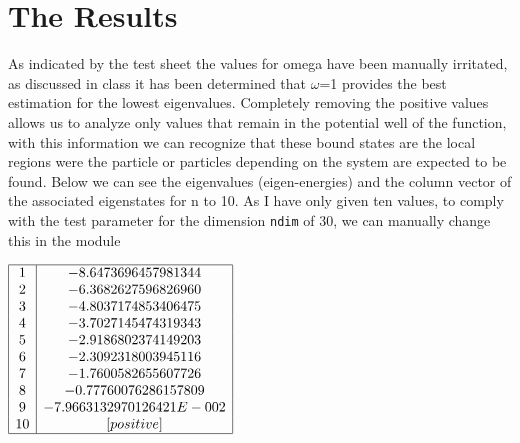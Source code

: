 \documentclass[12pt,letterpaper,notitlepage]{article}
\begin{document}
 \section{The Results}
 
 As indicated by the test sheet the values for omega have been manually irritated, as discussed in class it has been determined that $\omega$=1 provides the best estimation for the lowest eigenvalues. Completely removing the positive values allows us to analyze only values that remain in the potential well of the function, with this information we can recognize that these bound states are the local regions were the particle or particles depending on the system are expected to be found. Below we can see the eigenvalues (eigen-energies) and the column vector of the associated eigenstates for n to 10.  As I have only given ten values, to comply with the test parameter for the dimension {\tt ndim} of 30, we can manually change this in the module
 
\begin {center}
	$\begin{array} {|c|c|}
		\hline
	   1  &-8.6473696457981344\\
           2  &-6.3682627596826960\\
           3  &-4.8037174853406475\\
           4  &-3.7027145474319343\\
           5  &-2.9186802374149203\\
           6  &-2.3092318003945116\\
           7  &-1.7600582655607726\\
           8  &-0.77760076286157809\\
           9  &-7.9663132970126421E-002\\
          10 &[positive]\\
          \hline
      \end{array}$
      \end{center}
 
\end{document}
